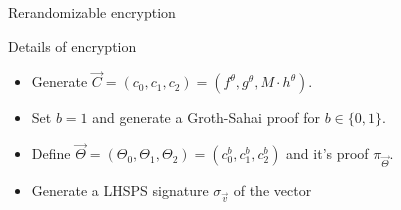 \begin{frame}{Rerandomizable encryption}

  \begin{block}{Details of encryption}
  \begin{itemize}
    \pause
  \item Generate $\vec{C} = (c_0, c_1, c_2) = (f^{\theta},  g^{\theta}, M \cdot h^{\theta})$.
    \pause
  \item Set $b = 1$ and generate a Groth-Sahai proof for $b \in \{0,1\}$.
    \pause
  \item Define $\vec{\Theta} = (\Theta_0, \Theta_1, \Theta_2) = (c_0^b, c_1^b, c_2^b)$ and it's proof $\pi_{\vec{\Theta}}$.
    \pause
  \item Generate a LHSPS signature $\sigma_{\vec{v}}$ of the vector
    

\end{itemize}
\end{block}
\end{frame}
